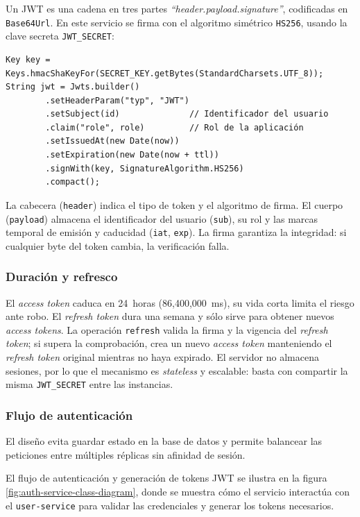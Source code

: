 Un JWT es una cadena en tres partes \emph{``header.payload.signature''}, codificadas en \texttt{Base64Url}.  
En este servicio se firma con el algoritmo simétrico \texttt{HS256}, usando la clave secreta
\lstinline|JWT_SECRET|:

\begin{verbatim}
Key key = Keys.hmacShaKeyFor(SECRET_KEY.getBytes(StandardCharsets.UTF_8));
String jwt = Jwts.builder()
        .setHeaderParam("typ", "JWT")
        .setSubject(id)              // Identificador del usuario
        .claim("role", role)         // Rol de la aplicación
        .setIssuedAt(new Date(now))
        .setExpiration(new Date(now + ttl))
        .signWith(key, SignatureAlgorithm.HS256)
        .compact();
\end{verbatim}

La cabecera (\texttt{header}) indica el tipo de token y el algoritmo de firma.  
El cuerpo (\texttt{payload}) almacena el identificador del usuario (\texttt{sub}), su rol y las marcas
temporal de emisión y caducidad (\texttt{iat}, \texttt{exp}).  
La firma garantiza la integridad: si cualquier byte del token cambia, la verificación falla.

\subsubsection*{Duración y refresco}

El \emph{access token} caduca en 24~horas (86,400,000~ms), su vida corta limita el riesgo ante robo.  
El \emph{refresh token} dura una semana y sólo sirve para
obtener nuevos \emph{access tokens}.  
La operación \texttt{refresh} valida la firma y la vigencia del \emph{refresh token};  
si supera la comprobación, crea un nuevo \emph{access token} manteniendo el \emph{refresh token} 
original mientras no haya expirado.  
El servidor no almacena sesiones, por lo que el mecanismo es \emph{stateless} y escalable: basta con
compartir la misma \lstinline|JWT_SECRET| entre las instancias.

\subsubsection*{Flujo de autenticación}

El diseño evita guardar estado en la base de datos y permite balancear las peticiones entre múltiples
réplicas sin afinidad de sesión.  

El flujo de autenticación y generación de tokens JWT se ilustra en la figura \ref{fig:auth-service-class-diagram}, donde se muestra cómo el servicio interactúa con el \texttt{user-service} para validar las credenciales y generar los tokens necesarios.

